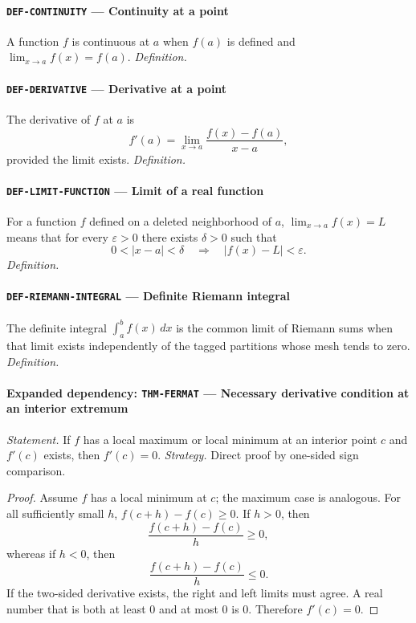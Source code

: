 \documentclass[10pt]{article}
\newcommand{\pidraw}[1]{\begingroup\urlstyle{tt}\nolinkurl{#1}\endgroup}
\theoremstyle{definition}
\theoremstyle{remark}
\begin{document}
\paragraph{\pidraw{DEF-CONTINUITY} --- Continuity at a point}
A function $f$ is continuous at $a$ when $f(a)$ is defined and $\lim_{x\to a}f(x)=f(a)$.
\textit{Definition.}

\paragraph{\pidraw{DEF-DERIVATIVE} --- Derivative at a point}
The derivative of $f$ at $a$ is
\[
f'(a)=\lim_{x\to a}\frac{f(x)-f(a)}{x-a},
\]
provided the limit exists.
\textit{Definition.}

\paragraph{\pidraw{DEF-LIMIT-FUNCTION} --- Limit of a real function}
For a function $f$ defined on a deleted neighborhood of $a$, $\lim_{x\to a}f(x)=L$ means that for every $\varepsilon>0$ there exists $\delta>0$ such that
\[
0<|x-a|<\delta\quad\Longrightarrow\quad |f(x)-L|<\varepsilon.
\]
\textit{Definition.}

\paragraph{\pidraw{DEF-RIEMANN-INTEGRAL} --- Definite Riemann integral}
The definite integral $\int_a^b f(x)\,dx$ is the common limit of Riemann sums when that limit exists independently of the tagged partitions whose mesh tends to zero.
\textit{Definition.}

\paragraph{Expanded dependency: \pidraw{THM-FERMAT} --- Necessary derivative condition at an interior extremum}
\textit{Statement.} If $f$ has a local maximum or local minimum at an interior point $c$ and $f'(c)$ exists, then $f'(c)=0$.
\textit{Strategy.} Direct proof by one-sided sign comparison.
\begin{proof}Assume $f$ has a local minimum at $c$; the maximum case is analogous.
For all sufficiently small $h$,
$f(c+h)-f(c)\ge0$. If $h>0$, then
\[
\frac{f(c+h)-f(c)}{h}\ge0,
\]
whereas if $h<0$, then
\[
\frac{f(c+h)-f(c)}{h}\le0.
\]
If the two-sided derivative exists, the right and left limits must agree.
A real number that is both at least $0$ and at most $0$ is $0$.
Therefore $f'(c)=0$.\end{proof}
\end{document}

